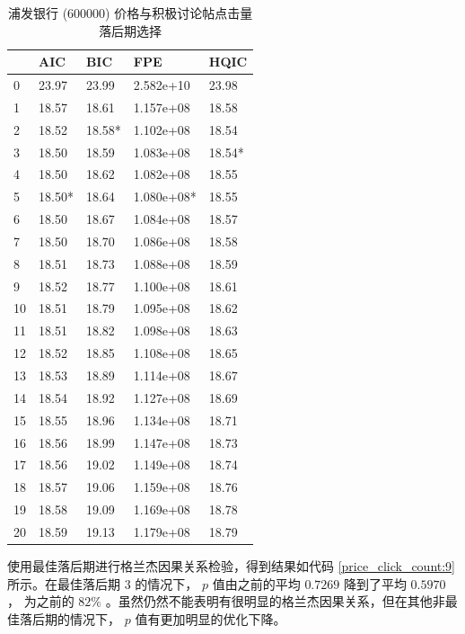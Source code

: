 \begin{table}
  \centering
  \caption{浦发银行 (600000) 价格与积极讨论帖点击量落后期选择}
  \label{price_click_count:8}
  \begin{tabularx}{0.75\textwidth}{XXXXX}
    \toprule
    & AIC & BIC & FPE & HQIC \\
    \midrule
    0 & 23.97 & 23.99 & 2.582e+10 & 23.98 \\
    1 & 18.57 & 18.61 & 1.157e+08 & 18.58 \\
    2 & 18.52 & 18.58* & 1.102e+08 & 18.54 \\
    3 & 18.50 & 18.59 & 1.083e+08 & 18.54* \\
    4 & 18.50 & 18.62 & 1.082e+08 & 18.55 \\
    5 & 18.50* & 18.64 & 1.080e+08* & 18.55 \\
    6 & 18.50 & 18.67 & 1.084e+08 & 18.57 \\
    7 & 18.50 & 18.70 & 1.086e+08 & 18.58 \\
    8 & 18.51 & 18.73 & 1.088e+08 & 18.59 \\
    9 & 18.52 & 18.77 & 1.100e+08 & 18.61 \\
    10 & 18.51 & 18.79 & 1.095e+08 & 18.62 \\
    11 & 18.51 & 18.82 & 1.098e+08 & 18.63 \\
    12 & 18.52 & 18.85 & 1.108e+08 & 18.65 \\
    13 & 18.53 & 18.89 & 1.114e+08 & 18.67 \\
    14 & 18.54 & 18.92 & 1.127e+08 & 18.69 \\
    15 & 18.55 & 18.96 & 1.134e+08 & 18.71 \\
    16 & 18.56 & 18.99 & 1.147e+08 & 18.73 \\
    17 & 18.56 & 19.02 & 1.149e+08 & 18.74 \\
    18 & 18.57 & 19.06 & 1.159e+08 & 18.76 \\
    19 & 18.58 & 19.09 & 1.169e+08 & 18.78 \\
    20 & 18.59 & 19.13 & 1.179e+08 & 18.79 \\
    \bottomrule
  \end{tabularx}
\end{table}

使用最佳落后期进行格兰杰因果关系检验，得到结果如代码 \ref{price_click_count:9} 所示。在最佳落后期 $3$ 的情况下， $p$ 值由之前的平均 $0.7269$ 降到了平均 $0.5970$ ， 为之前的 $82\%$ 。虽然仍然不能表明有很明显的格兰杰因果关系，但在其他非最佳落后期的情况下， $p$ 值有更加明显的优化下降。

